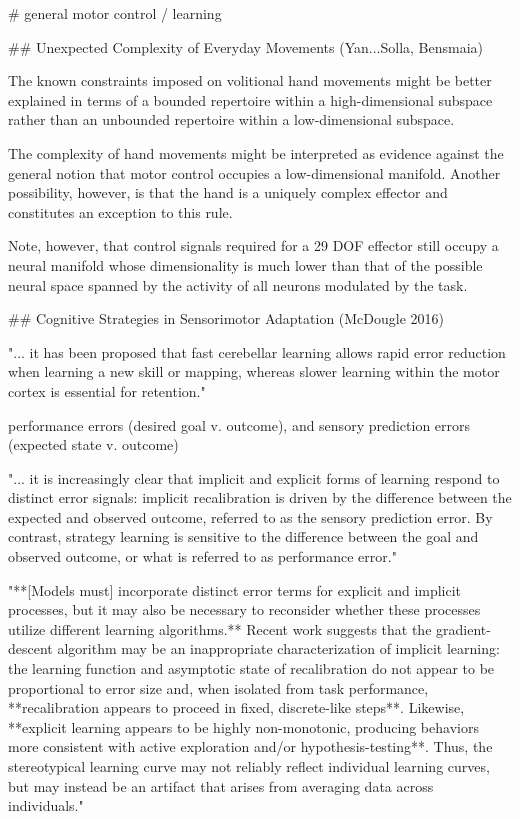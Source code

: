 \documentclass[../main.tex]{subfiles}
\begin{document}
{{# general motor control / learning


## Unexpected Complexity of Everyday Movements (Yan...Solla, Bensmaia)

The known constraints imposed on volitional hand movements might be better explained in terms of a bounded repertoire within a high-dimensional subspace rather than an unbounded repertoire within a low-dimensional subspace.

The complexity of hand movements might be interpreted as evidence against the general notion that motor control occupies a low-dimensional manifold. Another possibility, however, is that the hand is a uniquely complex effector and constitutes an exception to this rule.

Note, however, that control signals required for a 29 DOF effector still occupy a neural manifold whose dimensionality is much lower than that of the possible neural space spanned by the activity of all neurons modulated by the task.

## Cognitive Strategies in Sensorimotor Adaptation (McDougle 2016)

"... it has been proposed that fast cerebellar learning allows rapid error reduction when learning a new skill or mapping, whereas slower learning within the motor cortex is essential for retention."

performance errors (desired goal v. outcome), and sensory prediction errors (expected state v. outcome)

"... it is increasingly clear that implicit and explicit forms of learning respond to distinct error signals: implicit recalibration is driven by the difference between the expected and observed outcome, referred to as the sensory prediction error. By contrast, strategy learning is sensitive to the difference between the goal and observed outcome, or what is referred to as performance error."

"**[Models must] incorporate distinct error terms for explicit and implicit processes, but it may also be necessary to reconsider whether these processes utilize different learning algorithms.** Recent work suggests that the gradient-descent algorithm may be an inappropriate characterization of implicit learning: the learning function and asymptotic state of recalibration do not appear to be proportional to error size and, when isolated from task performance, **recalibration appears to proceed in fixed, discrete-like steps**. Likewise, **explicit learning appears to be highly non-monotonic, producing behaviors more consistent with active exploration and/or hypothesis-testing**. Thus, the stereotypical learning curve may not reliably reflect individual learning curves, but may instead be an artifact that arises from averaging data across individuals."

}}
\end{document}
